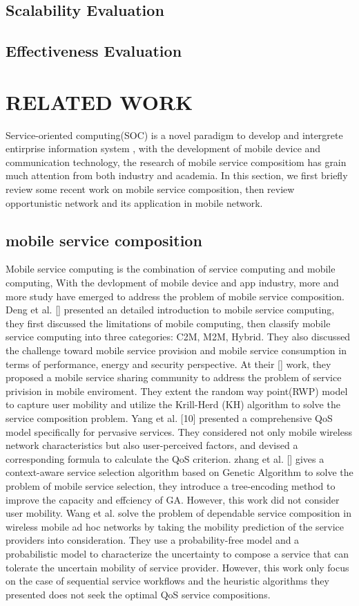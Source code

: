 \documentclass[10pt,journal,compsoc]{IEEEtran}
\begin{document}
\subsection{Scalability Evaluation}
\subsection{Effectiveness Evaluation}

\section{RELATED WORK}
Service-oriented computing(SOC) is a novel paradigm to develop and intergrete entirprise information system \cite{}, with the development of mobile device and communication technology, the research of mobile service compositiom has grain much attention from both industry and academia. In this section, we first briefly review some recent work on mobile service composition, then review opportunistic network and its application in mobile network.

\subsection{mobile service composition}
Mobile service computing is the combination of service computing and mobile computing, With the devlopment of mobile device and app industry, more and more study have emerged to address the problem of mobile service composition. 
Deng et al. [] presented an detailed introduction to mobile service computing, they first discussed the limitations of mobile computing, then classify mobile service computing into three categories: C2M, M2M, Hybrid. They also discussed the challenge toward mobile service provision and mobile service consumption in terms of performance, energy and security perspective. At their [] work, they proposed a mobile service sharing community to address the problem of service privision in mobile enviroment. They extent the random way point(RWP) model to capture user mobility and utilize the Krill-Herd (KH) algorithm to solve the service composition problem. Yang et al. [10] presented a comprehensive QoS model specifically for pervasive services. They considered not only mobile wireless network characteristics but also user-perceived factors, and devised a corresponding formula to calculate the QoS criterion. 
zhang et al. [] gives a context-aware service selection algorithm based on Genetic Algorithm to solve the problem of mobile service selection, they introduce a tree-encoding method to improve the capacity and effciency of GA. However, this work did not consider user mobility.
Wang et al. \cite{wang2011exploiting} solve the problem of dependable service composition in wireless mobile ad hoc networks by taking the mobility prediction of the service providers into consideration.
They use a probability-free model and a probabilistic model to characterize the uncertainty to compose a service that can tolerate the uncertain mobility of service provider. However, this work only focus on the case of sequential service workflows and the heuristic algorithms they presented does not seek the optimal QoS service compositions.
\end{document}
